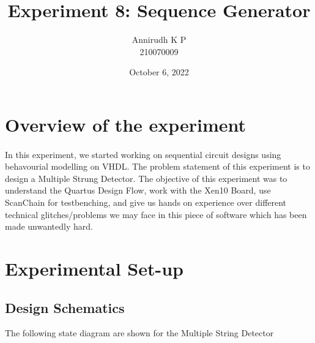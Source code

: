 \documentclass[12pt]{article}
\title{Experiment 8: Sequence Generator}
\author{Annirudh K P\\%
210070009}
\date{October 6, 2022}
\begin{document}
\maketitle

\section{Overview of the experiment}
\paragraph{}
In this experiment, we started working on sequential circuit designs using behavourial modelling on VHDL. The problem statement of this experiment is to design a Multiple Strung Detector. The objective of this experiment was to understand the Quartus Design Flow, work with the Xen10 Board, use ScanChain for testbenching, and give us hands on experience over different technical glitches/problems we may face in this piece of software which has been made unwantedly hard.

\section{Experimental Set-up}

\subsection{Design Schematics}
The following state diagram are shown for the Multiple String Detector
\end{document}
